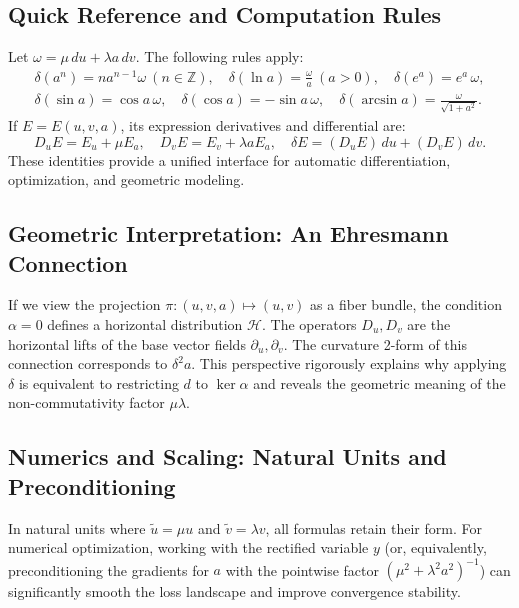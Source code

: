 \subsection{Quick Reference and Computation Rules}
Let $\omega=\mu\,du+\lambda a\,dv$. The following rules apply:
\begin{gather}
\delta(a^n)=n a^{n-1}\omega\ (n\in\mathbb{Z}),\quad
\delta(\ln a)=\frac{\omega}{a}\ (a>0),\quad
\delta(e^a)=e^a\,\omega, \label{eq:13} \tag{13} \\
\delta(\sin a)=\cos a\,\omega,\quad \delta(\cos a)=-\sin a\,\omega,\quad
\delta(\arcsin a)=\frac{\omega}{\sqrt{1+a^2}}. \label{eq:14} \tag{14}
\end{gather}
If $E=E(u,v,a)$, its expression derivatives and differential are:
\begin{equation}\label{eq:15}\tag{15}
D_uE=E_u+\mu E_a,\quad D_vE=E_v+\lambda a E_a,\quad
\delta E=(D_uE)\,du+(D_vE)\,dv.
\end{equation}
These identities provide a unified interface for automatic differentiation, optimization, and geometric modeling.

\subsection{Geometric Interpretation: An Ehresmann Connection}
If we view the projection $\pi:(u,v,a)\mapsto(u,v)$ as a fiber bundle, the condition $\alpha=0$ defines a horizontal distribution $\mathcal{H}$. The operators $D_u,D_v$ are the horizontal lifts of the base vector fields $\partial_u, \partial_v$. The curvature 2-form of this connection corresponds to $\delta^2 a$. This perspective rigorously explains why applying $\delta$ is equivalent to restricting $d$ to $\ker\alpha$ and reveals the geometric meaning of the non-commutativity factor $\mu\lambda$.

\subsection{Numerics and Scaling: Natural Units and Preconditioning}
In natural units where $\tilde u=\mu u$ and $\tilde v=\lambda v$, all formulas retain their form. For numerical optimization, working with the rectified variable $y$ (or, equivalently, preconditioning the gradients for $a$ with the pointwise factor $(\mu^2+\lambda^2 a^2)^{-1}$) can significantly smooth the loss landscape and improve convergence stability.
